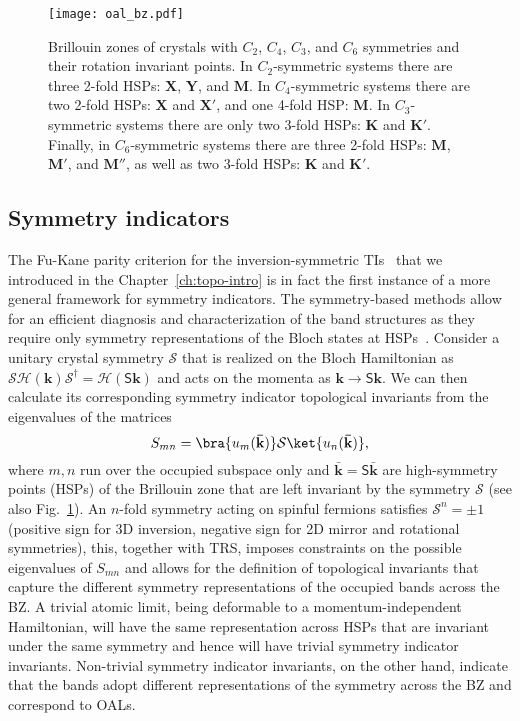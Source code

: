 \begin{figure}[H]
\centering
\texttt{[image: oal\_bz.pdf]}
\caption[Brillouin zones of crystals with $C_2$, $C_4$, $C_3$, and $C_6$ symmetries and their rotation invariant points]{Brillouin zones of crystals with $C_2$, $C_4$, $C_3$, and $C_6$ symmetries and their rotation invariant points. In $C_2$-symmetric systems there are three 2-fold HSPs: $\mathbf{X}$, $\mathbf{Y}$, and $\mathbf{M}$. In $C_4$-symmetric systems there are two 2-fold HSPs: $\mathbf{X}$ and $\mathbf{X'}$, and one 4-fold HSP: $\mathbf{M}$. In $C_3$-symmetric systems there are only two 3-fold HSPs: $\mathbf{K}$ and $\mathbf{K'}$. Finally, in $C_6$-symmetric systems there are three 2-fold HSPs: $\mathbf{M}$, $\mathbf{M'}$, and $\mathbf{M''}$, as well as two 3-fold HSPs: $\mathbf{K}$ and $\mathbf{K'}$.}
\label{fig:BZ}
\end{figure}

\subsection{Symmetry indicators}
The Fu-Kane parity criterion for the inversion-symmetric TIs~\cite{FuKane2007} that we introduced in the Chapter~\ref{ch:topo-intro} is in fact the first instance of a more general framework for symmetry indicators. The symmetry-based methods allow for an efficient diagnosis and characterization of the band structures as they require only symmetry representations of the Bloch states at HSPs~\cite{Bradlyn17, Po2017}. Consider a unitary crystal symmetry $\mathcal{S}$ that is realized on the Bloch Hamiltonian as $\mathcal{S} \mathcal{H}(\mathbf{k}) \mathcal{S}^\dagger = \mathcal{H}(\mathsf{S} \mathbf{k})$ and acts on the momenta as $\mathbf{k} \rightarrow \mathsf{S} \mathbf{k}$. We can then calculate its corresponding symmetry indicator topological invariants from the eigenvalues of the matrices
\begin{equation}
S_{mn} = \bra{u_m(\mathbf{\bar{k}})} \mathcal{S} \ket{u_n(\mathbf{\bar{k}})},
\end{equation}
where $m,n$ run over the occupied subspace only and $\mathbf{\bar{k}} = \mathsf{S} \mathbf{\bar{k}}$ are high-symmetry points (HSPs) of the Brillouin zone that are left invariant by the symmetry $\mathcal{S}$ (see also Fig.~\ref{fig:BZ}). An $n$-fold symmetry acting on spinful fermions satisfies $\mathcal{S}^n = \pm1$ (positive sign for 3D inversion, negative sign for 2D mirror and rotational symmetries), this, together with TRS, imposes constraints on the possible eigenvalues of $S_{mn}$ and allows for the definition of topological invariants that capture the different symmetry representations of the occupied bands across the BZ. A trivial atomic limit, being deformable to a momentum-independent Hamiltonian, will have the same representation across HSPs that are invariant under the same symmetry and hence will have trivial symmetry indicator invariants. Non-trivial symmetry indicator invariants, on the other hand, indicate that the bands adopt different representations of the symmetry across the BZ and correspond to OALs.

